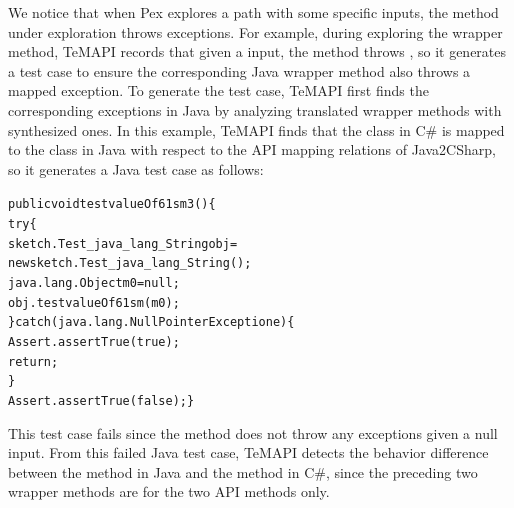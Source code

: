 We notice that when Pex explores a path with some specific inputs, the method under exploration throws exceptions.
For example, during exploring the  wrapper method, TeMAPI records that given a  input, the method throws , so it generates a test case to ensure the corresponding Java wrapper method also throws a mapped exception. To generate the test case, TeMAPI first finds the corresponding exceptions in Java by analyzing translated wrapper methods with synthesized ones. In this example, TeMAPI finds that the  class in C\# is mapped to the  class in Java with respect to the API mapping relations of Java2CSharp, so it generates a Java test case as follows:

\begin{CodeOut}\vspace*{-1ex}
\begin{alltt}
 public void testvalueOf61sm3()\{
   try\{
     sketch.Test_java_lang_String obj =
           new sketch.Test_java_lang_String();
     java.lang.Object m0 = null;
     obj.testvalueOf61sm(m0);
   \}catch(java.lang.NullPointerException e)\{
     Assert.assertTrue(true);
     return;
   \}
   Assert.assertTrue(false); \}
\end{alltt}
\end{CodeOut}\vspace*{-1ex}

This test case fails since the  method does not throw any exceptions given a null input.
From this failed Java test case, TeMAPI detects the behavior difference between the  method in Java and the  method in C\#, since the preceding two wrapper methods are for the two API methods only.


